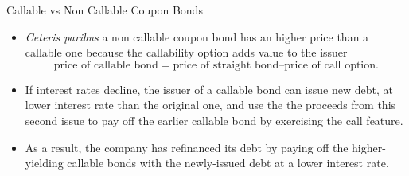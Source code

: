 \documentclass{beamer}
\begin{document}
\begin{frame}{Callable vs Non Callable Coupon Bonds}
	\begin{itemize}
		\item<1-> \emph{Ceteris paribus} a non callable coupon bond has an higher price than a callable one because the callability option adds value to the issuer
		\begin{equation*}
			\text{price of callable bond} = \text{price of straight bond} – \text{price of call option}.
		\end{equation*}
		\item<2-> If interest rates decline, the issuer of a callable bond can issue new debt, at lower interest rate than the original one, and use the the proceeds from this second issue to pay off the earlier callable bond by exercising the call feature.
		\item<2-> As a result, \textcolor{maincolor}{the company has refinanced its debt by paying off the higher-yielding callable bonds with the newly-issued debt at a lower interest rate}.
	\end{itemize}
\end{frame}

\end{document}

